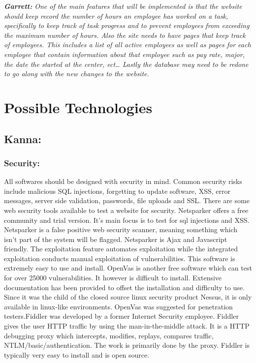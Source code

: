 \documentclass[letterpaper,10pt,titlepage,journal,compsoc,draftclsnofoot,onecolumn]{IEEEtran}
\newcommand\tab[1][1cm]{\hspace*{#1}}
\begin{document}
\textit{\textbf{Garrett:} \newline
\tab One of the main features that will be implemented is that the website should keep record the number of hours an employee has worked on a task, specifically to keep track of task progress and to prevent employees from exceeding the maximum number of hours. Also the site needs to have pages that keep track of employees. This includes a list of all active employees as well as pages for each employee that contain information about that employee such as pay rate, major, the date the started at the center, ect… Lastly the database may need to be redone to go along with the new changes to the website. }

\section{Possible Technologies}

\subsection{Kanna:} 
\subsubsection{Security:}
\tab All softwares should be designed with security in mind. Common security risks include malicious SQL injections, forgetting to update software, XSS, error messages, server side validation, passwords, file uploads and SSL. There are some web security tools available to test a website for security. \newline\newline\tab Netsparker offers a free community and trial version. It’s main focus is to test for sql injections and XSS. Netsparker is a false positive web security scanner, meaning something which isn’t part of the system will be flagged. Netsparker is Ajax and Javascript friendly. The exploitation feature automates exploitation while the integrated exploitation conducts manual exploitation of vulnerabilities. This software is extremely easy to use and install. \newline \newline \tab OpenVas is another free software which can test for over 25000 vulnerabilities. It however is difficult to install. Extensive documentation has been provided to offset the installation and difficulty to use. Since it was the child of the closed source linux security product Nessus, it is only available in linux-like environments. OpenVas was suggested for penetration testers.\newline\newline\tab Fiddler was developed by a former Internet Security employee. Fiddler gives the user HTTP traffic by using the man-in-the-middle attack. It is a HTTP debugging proxy which intercepts, modifies, replays, compares traffic, NTLM/basic/authentication. The work is primarily done by the proxy. Fiddler is typically very easy to install and is open source. \newline
\end{document}
